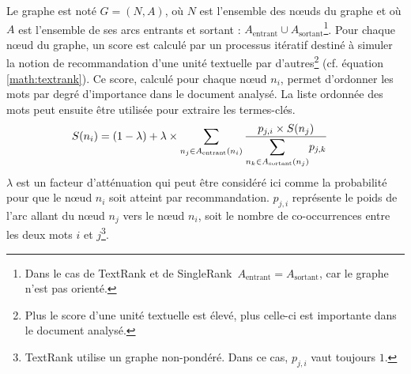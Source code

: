         Le graphe est noté $G = (N, A)$, où $N$ est l'ensemble des n\oe{}uds du
        graphe et où $A$ est l'ensemble de ses arcs entrants et sortant :
        $A_{\text{entrant}} \cup A_{\text{sortant}}$\footnote{Dans le cas de
        TextRank et de SingleRank\ $A_{\text{entrant}} = A_{\text{sortant}}$, car
        le graphe n'est pas orienté.}. Pour chaque n\oe{}ud du graphe, un score
        est calculé par un processus itératif destiné à simuler la notion de
        recommandation d'une unité textuelle par d'autres\footnote{Plus le score
        d'une unité textuelle est élevé, plus celle-ci est importante dans le
        document analysé.} (cf. équation \ref{math:textrank}). Ce score, calculé
        pour chaque n\oe{}ud $n_i$, permet d'ordonner les mots par degré
        d'importance dans le document analysé. La liste ordonnée des mots peut
        ensuite être utilisée pour extraire les termes-clés.
        \begin{align}
          S(n_i) &= (1 - \lambda) + \lambda \times \sum_{n_j \in A_{\text{entrant}}(n_i)} \frac{p_{j, i} \times S(n_j)}{\mathlarger{\sum}_{n_k \in A_{\text{sortant}}(n_j)} p_{j, k}} \label{math:textrank}
        \end{align}
        $\lambda$ est un facteur d'atténuation qui peut être considéré ici comme
        la probabilité pour que le n\oe{}ud $n_i$ soit atteint par recommandation.
        $p_{j, i}$ représente le poids de l'arc allant du n\oe{}ud $n_j$ vers le
        n\oe{}ud $n_i$, soit le nombre de co-occurrences entre les deux mots $i$
        et $j$\footnote{TextRank utilise un graphe non-pondéré. Dans ce cas,
        $p_{j, i}$ vaut toujours $1$.}.

